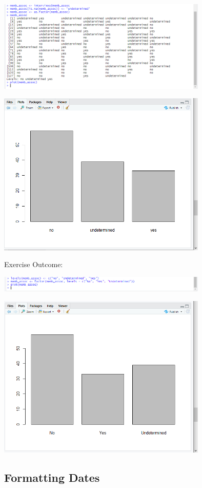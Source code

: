 \documentclass{article}
\begin{document}
\includegraphics[width=10cm]{Images/RStudio029.PNG}

\includegraphics[width=10cm]{Images/RStudio030.PNG}

Exercise Outcome:

\includegraphics[width=10cm]{Images/RStudio031.PNG}

\includegraphics[width=10cm]{Images/RStudio032.PNG}


\subsection{Formatting Dates}
\end{document}
